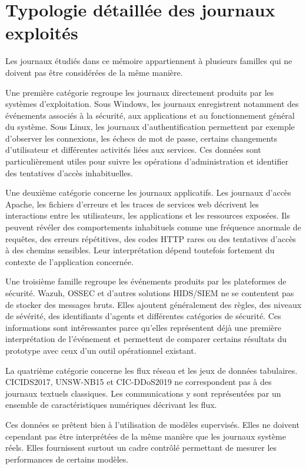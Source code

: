 \section{Typologie détaillée des journaux exploités}

Les journaux étudiés dans ce mémoire appartiennent à plusieurs familles qui ne doivent pas être considérées de la même manière.

Une première catégorie regroupe les journaux directement produits par les systèmes d'exploitation. Sous Windows, les journaux enregistrent notamment des événements associés à la sécurité, aux applications et au fonctionnement général du système. Sous Linux, les journaux d'authentification permettent par exemple d'observer les connexions, les échecs de mot de passe, certains changements d'utilisateur et différentes activités liées aux services. Ces données sont particulièrement utiles pour suivre les opérations d'administration et identifier des tentatives d'accès inhabituelles.

Une deuxième catégorie concerne les journaux applicatifs. Les journaux d'accès Apache, les fichiers d'erreurs et les traces de services web décrivent les interactions entre les utilisateurs, les applications et les ressources exposées. Ils peuvent révéler des comportements inhabituels comme une fréquence anormale de requêtes, des erreurs répétitives, des codes HTTP rares ou des tentatives d'accès à des chemins sensibles. Leur interprétation dépend toutefois fortement du contexte de l'application concernée.

Une troisième famille regroupe les événements produits par les plateformes de sécurité. Wazuh, OSSEC et d'autres solutions HIDS/SIEM ne se contentent pas de stocker des messages bruts. Elles ajoutent généralement des règles, des niveaux de sévérité, des identifiants d'agents et différentes catégories de sécurité. Ces informations sont intéressantes parce qu'elles représentent déjà une première interprétation de l'événement et permettent de comparer certains résultats du prototype avec ceux d'un outil opérationnel existant.

La quatrième catégorie concerne les flux réseau et les jeux de données tabulaires. CICIDS2017, UNSW-NB15 et CIC-DDoS2019 ne correspondent pas à des journaux textuels classiques. Les communications y sont représentées par un ensemble de caractéristiques numériques décrivant les flux.

Ces données se prêtent bien à l'utilisation de modèles supervisés. Elles ne doivent cependant pas être interprétées de la même manière que les journaux système réels. Elles fournissent surtout un cadre contrôlé permettant de mesurer les performances de certains modèles.

